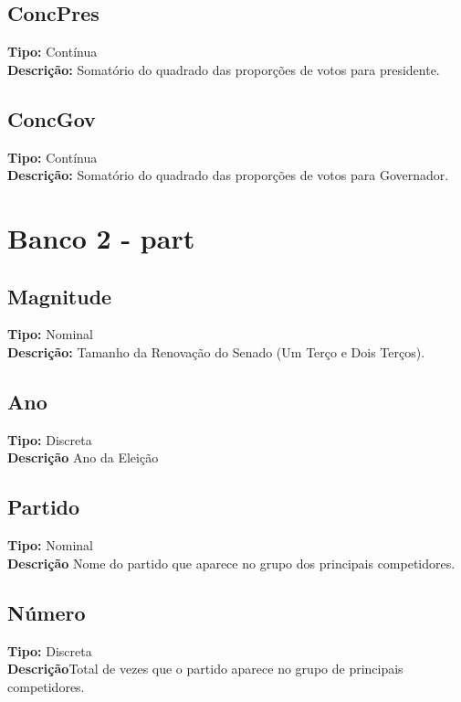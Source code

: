 \documentclass[12pt]{article}
\begin{document}
		\subsection{ConcPres}
		{\bf Tipo:} Contínua \\
		{\bf Descrição:} Somatório do quadrado das proporções de votos para presidente.\\
		
		\subsection{ConcGov}
		{\bf Tipo:} Contínua \\
		{\bf Descrição:} Somatório do quadrado das proporções de votos para Governador.\\
		
		\section{Banco 2 - part}
	
		\subsection{Magnitude}
		{\bf Tipo:} Nominal \\
		{\bf Descrição:} Tamanho da Renovação do Senado (Um Terço e Dois Terços).\\
		
		\subsection{Ano}
		{\bf Tipo:} Discreta \\
		{\bf Descrição} Ano da Eleição \\
		
		\subsection{Partido}
		{\bf Tipo:} Nominal \\
		{\bf Descrição} Nome do partido que aparece no grupo dos principais competidores.\\
		
		\subsection{Número}
		{\bf Tipo:} Discreta \\
		{\bf Descrição}Total de vezes que o partido aparece no grupo de principais competidores.\\
		
\end{document}
